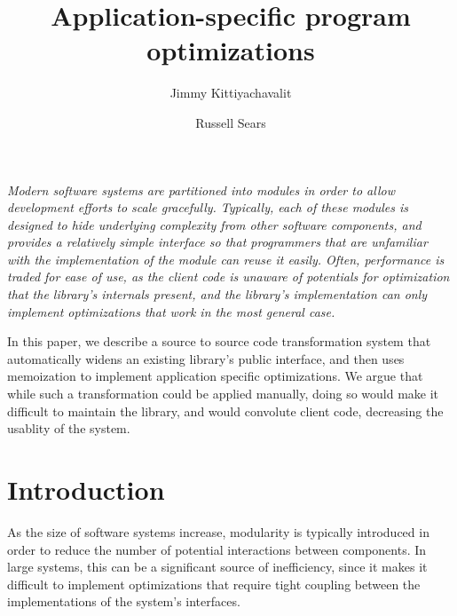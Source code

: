 \documentclass[10pt,letterpaper,twocolumn,english]{article}
\begin{document}
\title{\vspace*{-36pt}Application-specific program optimizations}
\author{Jimmy Kittiyachavalit \and Russell Sears}
\maketitle




{\em 
Modern software systems are partitioned into modules in order to allow
development efforts to scale gracefully.  Typically, each of these
modules is designed to hide underlying complexity from other software
components, and provides a relatively simple interface so that
programmers that are unfamiliar with the implementation of the module
can reuse it easily. Often, performance is traded for ease of use, as
the client code is unaware of potentials for optimization that the
library's internals present, and the library's implementation can only
implement optimizations that work in the most general case.

In this paper, we describe a source to source code transformation
system that automatically widens an existing library's public
interface, and then uses memoization to implement application specific
optimizations.  We argue that while such a transformation could be
applied manually, doing so would make it difficult to maintain the
library, and would convolute client code, decreasing the usablity of
the system.
}


\section{Introduction}
\label {intro}

As the size of software systems increase, modularity is typically
introduced in order to reduce the number of potential interactions
between components.  In large systems, this can be a significant
source of inefficiency, since it makes it difficult to implement
optimizations that require tight coupling between the implementations
of the system's interfaces.
\end{document}
